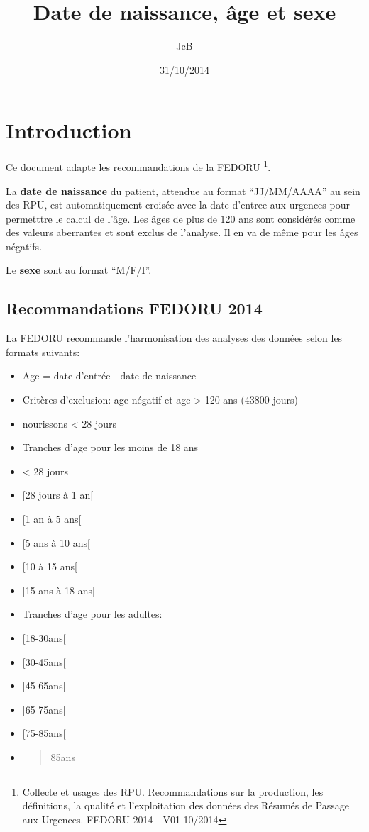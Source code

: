 \documentclass[]{article}
\title{Date de naissance, âge et sexe}
\author{JcB}
\date{31/10/2014}
\let\rmarkdownfootnote\footnote%
\def\footnote{\protect\rmarkdownfootnote}
\begin{document}
\maketitle


{
\hypersetup{linkcolor=black}
\setcounter{tocdepth}{2}
\tableofcontents
}
\section{Introduction}\label{introduction}

Ce document adapte les recommandations de la FEDORU
\footnote{Collecte et usages des RPU. Recommandations sur la production, les définitions, la qualité et l'exploitation des données des Résumés de Passage aux Urgences. FEDORU 2014 - V01-10/2014}.

La \textbf{date de naissance} du patient, attendue au format
``JJ/MM/AAAA'' au sein des RPU, est automatiquement croisée avec la date
d'entree aux urgences pour permetttre le calcul de l'âge. Les âges de
plus de $120$ ans sont considérés comme des valeurs aberrantes et sont
exclus de l'analyse. Il en va de même pour les âges négatifs.

Le \textbf{sexe} sont au format ``M/F/I''.

\subsection{Recommandations FEDORU
2014}\label{recommandations-fedoru-2014}

La FEDORU recommande l'harmonisation des analyses des données selon les
formats suivants:

\begin{itemize}
\item
  Age = date d'entrée - date de naissance
\item
  Critères d'exclusion: age négatif et age \textgreater{} 120 ans (43800
  jours)
\item
  nourissons \textless{} 28 jours
\item
  Tranches d'age pour les moins de 18 ans
\item
  \textless{} 28 jours
\item
  {[}28 jours à 1 an{[}
\item
  {[}1 an à 5 ans{[}
\item
  {[}5 ans à 10 ans{[}
\item
  {[}10 à 15 ans{[}
\item
  {[}15 ans à 18 ans{[}
\item
  Tranches d'age pour les adultes:
\item
  {[}18-30ans{[}
\item
  {[}30-45ans{[}
\item
  {[}45-65ans{[}
\item
  {[}65-75ans{[}
\item
  {[}75-85ans{[}
\item
  \begin{quote}
  85ans
  \end{quote}
\end{itemize}
\end{document}
